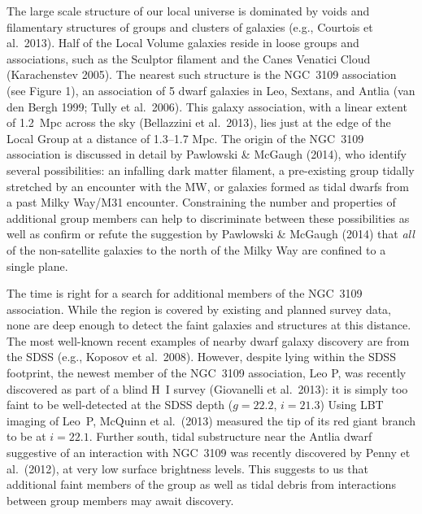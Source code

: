 The large scale structure of our local universe is dominated by voids and filamentary structures of groups and clusters of galaxies 
(e.g., Courtois et al.\ 2013).  Half of the Local Volume galaxies reside in loose groups and associations, such as the Sculptor filament 
and the Canes Venatici Cloud (Karachenstev 2005). The nearest such structure is the NGC~3109 association (see Figure 1), an
 association of 5 dwarf galaxies in Leo, Sextans, and Antlia (van den Bergh 1999; Tully et al.\ 2006). This galaxy association, 
 with a linear extent of 1.2~Mpc across the sky (Bellazzini et al.\ 2013), lies just at the edge of the Local Group at a distance of 
 1.3--1.7 Mpc. The origin of the NGC~3109 association is discussed in detail by Pawlowski \& McGaugh (2014), who identify 
 several possibilities: an infalling dark matter filament, a  pre-existing group tidally stretched by an encounter with the MW, or galaxies
 formed as tidal dwarfs from a past Milky Way/M31 encounter. Constraining the number and properties  of additional group
 members can help to discriminate between these possibilities as well as confirm or refute the suggestion by Pawlowski \& McGaugh (2014)
 that {\em all} of the non-satellite galaxies to the north of the Milky Way are confined to a single plane.

The time is right for a search for additional members of the NGC~3109 association. While the region is covered by existing  and planned
survey data, none are deep enough to detect the faint galaxies and  structures at this distance. The most
well-known recent examples of nearby dwarf galaxy discovery are from the SDSS (e.g., Koposov et al.\ 2008).
However, despite lying within the SDSS footprint, the newest member of the NGC~3109 association, Leo P, 
was recently discovered as part of a blind H~I survey (Giovanelli et al.\ 2013): it is simply too faint to
be well-detected at the SDSS  depth ($g=22.2$, $i=21.3$)
Using LBT imaging of Leo~P, McQuinn et al.\ (2013) measured the tip of its red giant branch to be at $i=22.1$.
Further south, tidal substructure near the Antlia dwarf suggestive of an interaction with NGC~3109 was recently discovered by Penny et al.\ (2012),
at very low surface brightness levels.
This suggests to us that additional  faint members of the group as well as tidal debris from interactions between group members 
may await discovery.


